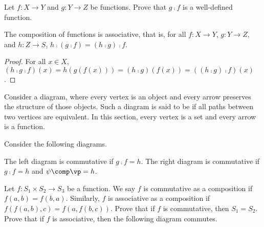 \documentclass[10pt]{article}
\begin{document}
\begin{problem}
    Let $f:X\to Y$ and $g:Y\to Z$ be functions. Prove that $g\comp f$ is a well-defined function.
\end{problem}
\begin{proposition}
    The composition of functions is associative, that is, for all $f:X\to Y$, $g:Y\to Z$, and $h:Z\to S$, $h\comp(g\comp f)=(h\comp g)\comp f$.
\end{proposition}
\begin{proof}
    For all $x\in X$, $(h\comp g\comp f)(x)=h(g(f(x)))=(h\comp g)(f(x))=((h\comp g)\comp f)(x)$.
\end{proof}
\par
Consider a diagram, where every vertex is an object and every arrow preserves the structure of those objects. Such a diagram is said to be  if all paths between two vertices are equivalent. In this section, every vertex is a set and every arrow is a function.
\begin{example}
    Consider the following diagrams.
    \begin{center}
        \hspace{3cm}
    \end{center}
    The left diagram is commutative if $g\comp f=h$. The right diagram is commutative if $g\comp f=h$ and $\psi\comp\vp=h$.
\end{example}
\begin{problem}
    Let $f:{S}_{1}\times{S}_{2}\to{S}_{3}$ be a function. We say $f$ is commutative as a composition if $f(a,b)=f(b,a)$. Similarly, $f$ is associative as a composition if $f(f(a,b),c)=f(a,f(b,c))$. Prove that if $f$ is commutative, then ${S}_{1}={S}_{2}$. Prove that if $f$ is associative, then the following diagram commutes.
    \begin{center}
    \end{center}
\end{problem}
\end{document}
